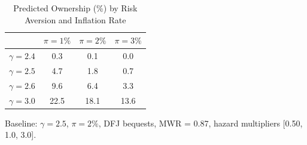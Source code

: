 \begin{table}[htbp]
\centering
\caption{Predicted Ownership (\%) by Risk Aversion and Inflation Rate}
\label{tab:robustness_gamma_inflation}
\begin{tabular}{lccc}
\toprule
 & $\pi = 1\%$ & $\pi = 2\%$ & $\pi = 3\%$ \\
\midrule
$\gamma = 2.4$ & 0.3 & 0.1 & 0.0 \\
$\gamma = 2.5$ & 4.7 & 1.8 & 0.7 \\
$\gamma = 2.6$ & 9.6 & 6.4 & 3.3 \\
$\gamma = 3.0$ & 22.5 & 18.1 & 13.6 \\
\bottomrule
\end{tabular}
\begin{tablenotes}
\small
\item Baseline: $\gamma = 2.5$, $\pi = 2\%$, DFJ bequests,
MWR = 0.87, hazard multipliers [0.50, 1.0, 3.0].
\end{tablenotes}
\end{table}
